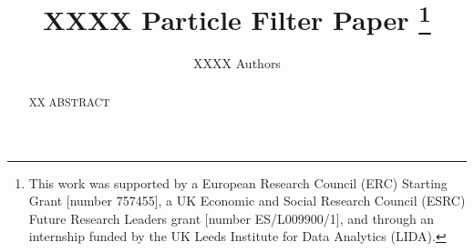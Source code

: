 \documentclass[runningheads]{llncs}
\begin{document}
%
\title{XXXX Particle Filter Paper
\thanks{This work was supported by a European Research Council (ERC) Starting Grant [number 757455], a UK Economic and Social Research Council (ESRC) Future Research Leaders grant [number ES/L009900/1], and through an internship funded by the UK Leeds Institute for Data Analytics (LIDA).}}

%
%

\author{ XXXX Authors } 
%

%

%
\maketitle              %
%
\begin{abstract}

XX ABSTRACT


\end{abstract}
%
%
%
 










\end{document}
